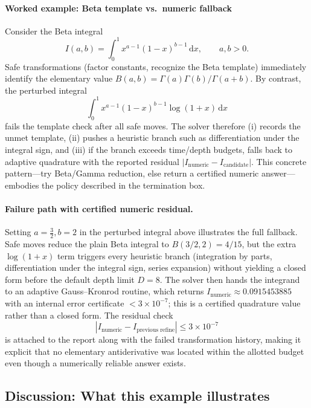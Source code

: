 \paragraph{Worked example: Beta template vs.\ numeric fallback}
Consider the Beta integral
\[
I(a, b) = \int_0^1 x^{a-1}(1-x)^{b-1}\,\mathrm{d}x, \qquad a, b>0.
\]
Safe transformations (factor constants, recognize the Beta template) immediately identify the elementary value \(B(a, b)=\Gamma(a)\Gamma(b)/\Gamma(a+b)\). By contrast, the perturbed integral
\[
\int_0^1 x^{a-1}(1-x)^{b-1}\log(1+x)\,\mathrm{d}x
\]
fails the template check after all safe moves. The solver therefore (i) records the unmet template, (ii) pushes a heuristic branch such as differentiation under the integral sign, and (iii) if the branch exceeds time/depth budgets, falls back to adaptive quadrature with the reported residual \(|I_{\text{numeric}}-I_{\text{candidate}}|\). This concrete pattern---try Beta/Gamma reduction, else return a certified numeric answer---embodies the policy described in the termination box.

\paragraph{Failure path with certified numeric residual.} Setting \(a=\tfrac{3}{2}, b=2\) in the perturbed integral above illustrates the full fallback. Safe moves reduce the plain Beta integral to \(B(3/2,2)=4/15\), but the extra \(\log(1+x)\) term triggers every heuristic branch (integration by parts, differentiation under the integral sign, series expansion) without yielding a closed form before the default depth limit \(D=8\). The solver then hands the integrand to an adaptive Gauss--Kronrod routine, which returns \(I_{\text{numeric}} \approx 0.0915453885\) with an internal error certificate \(<3\times 10^{-7}\); this is a certified quadrature value rather than a closed form. The residual check
\[
|I_{\text{numeric}} - I_{\text{previous refine}}| \le 3\times 10^{-7}
\]
is attached to the report along with the failed transformation history, making it explicit that no elementary antiderivative was located within the allotted budget even though a numerically reliable answer exists.

\subsection{Discussion: What this example illustrates}
\label{sec:symbolic_discussion_what_this_example_illustrates}

